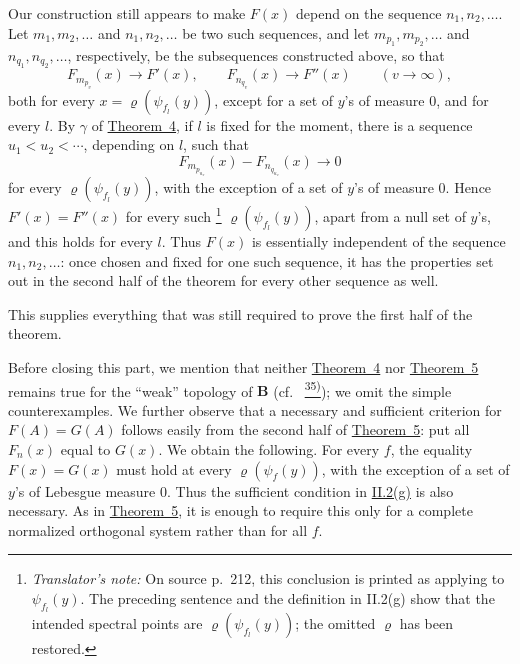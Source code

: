 \documentclass[12pt,b5paper,twoside]{article}
\newcommand{\noteref}[1]{%
  \hyperlink{note:#1}{\textsuperscript{#1)}}}
\newcommand{\translatorfootnote}[2]{%
  \begingroup
  \renewcommand{\thefootnote}{#1}%
  \footnote{\hspace{0.8em}\textit{Translator's note:} #2}%
  \endgroup}
\begin{document}
Our construction still appears to make \(F(x)\) depend on the sequence
\(n_1,n_2,\ldots\).  Let \(m_1,m_2,\ldots\) and \(n_1,n_2,\ldots\) be
two such sequences, and let \(m_{p_1},m_{p_2},\ldots\) and
\(n_{q_1},n_{q_2},\ldots\), respectively, be the subsequences constructed
above, so that
\[
 F_{m_{p_v}}(x)\longrightarrow F'(x),
 \qquad
 F_{n_{q_v}}(x)\longrightarrow F''(x)
 \qquad(v\to\infty),
\]
both for every \(x=\varrho(\psi_{f_l}(y))\), except for a set of \(y\)'s of
measure \(0\), and for every \(l\).  By
\hyperref[thm:4.gamma]{\(\gamma\)} of
\hyperref[thm:4]{Theorem~4}, if \(l\) is fixed for the moment, there is a
sequence \(u_1<u_2<\cdots\), depending on \(l\), such that
\[
 F_{m_{p_{u_v}}}(x)-F_{n_{q_{u_v}}}(x)\longrightarrow0
\]
for every \(\varrho(\psi_{f_l}(y))\), with the exception of a set of \(y\)'s
of measure \(0\).  Hence \(F'(x)=F''(x)\) for every such\translatorfootnote{T10}{On
source p.~212, this conclusion is printed as applying to
$\psi_{f_l}(y)$.  The preceding sentence and the definition in II.2(g)
show that the intended spectral points are $\varrho(\psi_{f_l}(y))$; the
omitted $\varrho$ has been restored.}
\(\varrho(\psi_{f_l}(y))\), apart from a null set of \(y\)'s, and this holds
for every \(l\).  Thus \(F(x)\) is essentially independent of the sequence
\(n_1,n_2,\ldots\): once chosen and fixed for one such sequence, it has
the properties set out in the second half of the theorem for every other
sequence as well.

This supplies everything that was still required to prove the first half
of the theorem.

Before closing this part, we mention that neither
\hyperref[thm:4]{Theorem~4} nor \hyperref[thm:5]{Theorem~5} remains true
for the ``weak'' topology of \(\mathbf B\) (cf.\ \noteref{35}); we omit
the simple counterexamples.  We further observe that a necessary and
sufficient criterion for \(F(A)=G(A)\) follows easily from the second half
of \hyperref[thm:5]{Theorem~5}: put all \(F_n(x)\) equal to \(G(x)\).
We obtain the following.  For every \(f\), the equality \(F(x)=G(x)\)
must hold at every \(\varrho(\psi_f(y))\), with the exception of a set of
\(y\)'s of Lebesgue measure \(0\).  Thus the sufficient condition in
\hyperref[prop:II.2.g]{II.2(g)} is also necessary.  As in
\hyperref[thm:5]{Theorem~5}, it is enough to require this only for a
complete normalized orthogonal system rather than for all \(f\).
\end{document}
